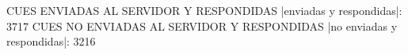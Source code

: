 CUES ENVIADAS AL SERVIDOR Y RESPONDIDAS
|enviadas y respondidas|: 3717
CUES NO ENVIADAS AL SERVIDOR Y RESPONDIDAS
|no enviadas y respondidas|: 3216